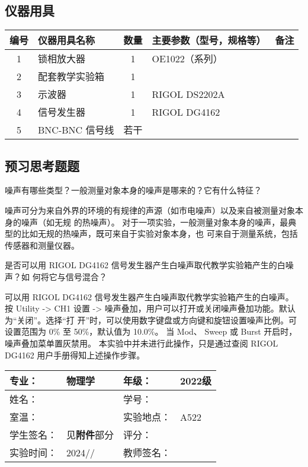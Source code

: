 \documentclass[dvipsnames, svgnames,a4paper,11pt]{article}
\begin{document}
	\subsection{仪器用具}
	\begin{tabular}{|c|m{4cm}|c|m{6cm}|c|}
		\hline
		编号 & 仪器用具名称 & 数量 & 主要参数（型号，规格等） & 备注 \\
		\hline
		1 & 锁相放大器 & 1 & OE1022（系列） &  \\
		\hline
		2 & 配套教学实验箱 & 1 &  &  \\
		\hline
		3 & 示波器 & 1 & RIGOL DS2202A &  \\
		\hline
		4 & 信号发生器 & 1 & RIGOL DG4162 &  \\
		\hline
		5 & BNC-BNC 信号线 & 若干 &  &  \\
		\hline
		\end{tabular}
	

	
	
	
	\subsection{预习思考题题}
	
	\begin{question}
		噪声有哪些类型？一般测量对象本身的噪声是哪来的？它有什么特征？
	\end{question}
	噪声可分为来自外界的环境的有规律的声源（如市电噪声）以及来自被测量对象本身的噪声（如无规
的热噪声）。
对于一项实验，一般测量对象本身的噪声，最典型的比如无规的热噪声，既可来自于实验对象本身，也
可来自于测量系统，包括传感器和测量仪器。
	\begin{question}
		是否可以用 RIGOL DG4162 信号发生器产生白噪声取代教学实验箱产生的白噪声？如
何将它与信号混合？
	\end{question}
	可以用 RIGOL DG4162 信号发生器产生白噪声取代教学实验箱产生的白噪声。
按 Utility -> CH1 设置 -> 噪声叠加，用户可以打开或关闭噪声叠加功能。默认为“关闭”。选择“打
开”时，可以使用数字键盘或方向键和旋钮设置噪声比例。可设置范围为 0\% 至 50\%，默认值为 10.0\%。
当 Mod、 Sweep 或 Burst 开启时，噪声叠加菜单置灰禁用。
本实验中并未进行此操作，只是通过查阅 RIGOL DG4162 用户手册得知上述操作步骤。

	
	
	
	\clearpage
	\begin{table}
		\renewcommand\arraystretch{1.7}
		\centering
		\begin{tabularx}{\textwidth}{|X|X|X|X|}
			\hline
			专业： & 物理学 & 年级： & 2022级 \\
			\hline
			姓名： &  & 学号： & \\
			\hline
			室温： &  & 实验地点： & A522 \\
			\hline
			学生签名：& 见\textbf{附件}部分 & 评分： &\\
			\hline
			实验时间：& 2024// & 教师签名：&\\
			\hline
		\end{tabularx}
	\end{table}
	
\end{document}
